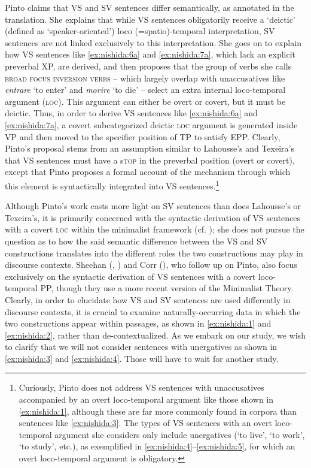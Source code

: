 \documentclass[output=paper,colorlinks,citecolor=brown,
]{langscibook}
\begin{document}
Pinto claims that VS and SV sentences differ semantically, as annotated in the translation. She explains that while VS sentences obligatorily receive a `deictic' (defined as `speaker-oriented') loco (=spatio)-temporal interpretation, SV sentences are not linked exclusively to this interpretation. She goes on to explain how VS sentences like \ref{ex:nishida:6a} and \ref{ex:nishida:7a}, which lack an explicit preverbal XP, are derived, and then proposes that the group of verbs she calls \textsc{broad focus inversion verbs} – which largely overlap with unaccusatives like \textit{entrare} 
`to enter' and \textit{morire} `to die' – select an extra internal loco-temporal argument (\textsc{loc}). This argument can either be overt or covert, but it must be deictic. Thus, in order to derive VS sentences like \ref{ex:nishida:6a} and \ref{ex:nishida:7a}, a covert subcategorized deictic \textsc{loc} argument is generated inside VP and then moved to the specifier position of TP to satisfy EPP. Clearly, Pinto's proposal stems from an assumption similar to Lahousse's and Texeira's that VS sentences must have a s\textsc{top} in the preverbal position (overt or covert), except that Pinto proposes a formal account of the mechanism through which this element is syntactically integrated into VS sentences.\footnote{Curiously, Pinto does not address VS sentences with unaccusatives accompanied by an overt loco-temporal argument like those shown in \ref{ex:nishida:1}, although these are far more commonly found in corpora than sentences like \ref{ex:nishida:3}. The types of VS sentences with an overt loco-temporal argument she considers only include unergatives (`to live', `to work', `to study', etc.), as exemplified in \ref{ex:nishida:4}--\ref{ex:nishida:5}, for which an overt loco-temporal argument is obligatory.}

Although Pinto's work casts more light on SV sentences than does Lahousse's or Texeira's, it is primarily concerned with the syntactic derivation of VS sentences with a covert \textsc{loc} within the minimalist framework (cf. \citealt{chomsky1995minimalist}); she does not pursue the question as to how the said semantic difference between the VS and SV constructions translates into the different roles the two constructions may play in discourse contexts. Sheehan (\citeyear{Sheehan2006}, \citeyear{Sheehan2010}) and Corr (\citeyear{corr2016wide}), who follow up on Pinto, also focus exclusively on the syntactic derivation of VS sentences with a covert loco-temporal PP, though they use a more recent version of the Minimalist Theory.
Clearly, in order to elucidate how VS and SV sentences are used differently in discourse contexts, it is crucial to examine naturally-occurring data in which the two constructions appear within passages, as shown in \ref{ex:nishida:1} and \ref{ex:nishida:2}, rather than de-contextualized. As we embark on our study, we wish to clarify that we will not consider sentences with unergatives as shown in \ref{ex:nishida:3} and \ref{ex:nishida:4}. Those will have to wait for another study.  
\end{document}
